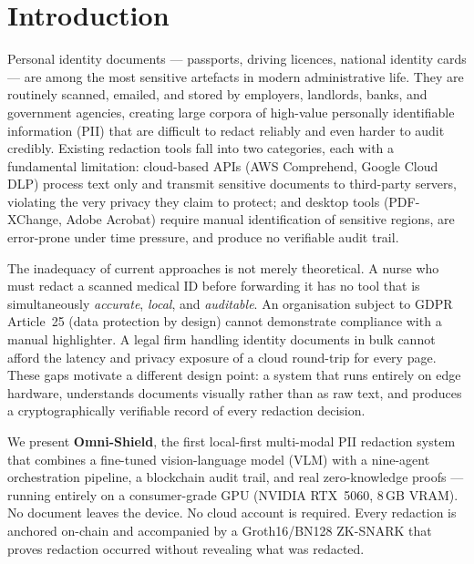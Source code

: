 \documentclass[conference]{IEEEtran}
\begin{document}
\section{Introduction}
\label{sec:introduction}

Personal identity documents --- passports, driving licences,
national identity cards --- are among the most sensitive
artefacts in modern administrative life.
They are routinely scanned, emailed, and stored by employers,
landlords, banks, and government agencies, creating large
corpora of high-value personally identifiable information
(PII) that are difficult to redact reliably and even
harder to audit credibly.
Existing redaction tools fall into two categories, each
with a fundamental limitation: cloud-based APIs (AWS
Comprehend, Google Cloud DLP) process text only and
transmit sensitive documents to third-party servers,
violating the very privacy they claim to protect;
and desktop tools (PDF-XChange, Adobe Acrobat) require
manual identification of sensitive regions, are error-prone
under time pressure, and produce no verifiable audit trail.

The inadequacy of current approaches is not merely
theoretical.
A nurse who must redact a scanned medical ID before
forwarding it has no tool that is simultaneously
\emph{accurate}, \emph{local}, and \emph{auditable}.
An organisation subject to GDPR Article~25 (data protection
by design) cannot demonstrate compliance with a manual
highlighter.
A legal firm handling identity documents in bulk cannot
afford the latency and privacy exposure of a cloud
round-trip for every page.
These gaps motivate a different design point: a system that
runs entirely on edge hardware, understands documents
visually rather than as raw text, and produces a
cryptographically verifiable record of every redaction
decision.

We present \textbf{Omni-Shield}, the first local-first
multi-modal PII redaction system that combines a
fine-tuned vision-language model (VLM) with a nine-agent
orchestration pipeline, a blockchain audit trail,
and real zero-knowledge proofs --- running entirely on
a consumer-grade GPU (NVIDIA RTX~5060, 8\,GB VRAM).
No document leaves the device.
No cloud account is required.
Every redaction is anchored on-chain and accompanied by
a Groth16/BN128 ZK-SNARK that proves redaction occurred
without revealing what was redacted.
\end{document}
